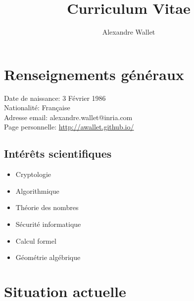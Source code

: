 \documentclass[11pt]{article}
\title{Curriculum Vitae}
\author{Alexandre Wallet}
\date{}
\begin{document}
\maketitle
\tableofcontents

\section{Renseignements généraux}
\begin{multicols}{2}
\noindent Date de naissance: 3 Février 1986\\
Nationalité: Française\\[10pt]

\noindent Adresse email: alexandre.wallet@inria.com\\
Page personnelle: {\footnotesize \url{http://awallet.github.io/}}\\

\end{multicols}

\subsection*{Intérêts scientifiques}

\begin{multicols}{2}
  \begin{itemize}
  \item Cryptologie
  \item Algorithmique
  \item Théorie des nombres
  \item Sécurité informatique
  \item Calcul formel
  \item Géométrie algébrique
  \end{itemize}
\end{multicols}
  

\section*{Situation actuelle}
\end{document}
